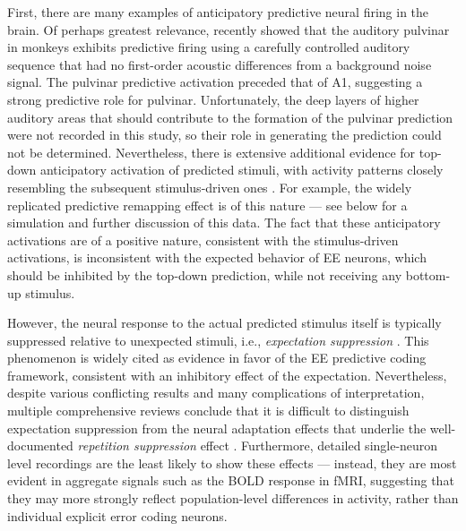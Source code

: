 \documentclass[11pt,twoside]{article}
\newif\myifpdf
\begin{document}
First, there are many examples of anticipatory predictive neural firing in the brain.  Of perhaps greatest relevance, \citet{BarczakOConnellMcGinnisEtAl18} recently showed that the auditory pulvinar in monkeys exhibits predictive firing using a carefully controlled auditory sequence that had no first-order acoustic differences from a background noise signal.  The pulvinar predictive activation preceded that of A1, suggesting a strong predictive role for pulvinar.  Unfortunately, the deep layers of higher auditory areas that should contribute to the formation of the pulvinar prediction were not recorded in this study, so their role in generating the prediction could not be determined.  Nevertheless, there is extensive additional evidence for top-down anticipatory activation of predicted stimuli, with activity patterns closely resembling the subsequent stimulus-driven ones \citep{WalshMcGovernClarkEtAl20}.  For example, the widely replicated predictive remapping effect is of this nature \citep{DuhamelColbyGoldberg92,Wurtz08,CavanaghHuntAfrazEtAl10} --- see below for a simulation and further discussion of this data.  The fact that these anticipatory activations are of a positive nature, consistent with the stimulus-driven activations, is inconsistent with the expected behavior of EE neurons, which should be inhibited by the top-down prediction, while not receiving any bottom-up stimulus.

However, the neural response to the actual predicted stimulus itself is typically suppressed relative to unexpected stimuli, i.e., \emph{expectation suppression} \citep{SummerfieldTrittschuhMontiEtAl08,TodorovicEdeMarisEtAl11,MeyerOlson11,BastosUsreyAdamsEtAl12}.  This phenomenon is widely cited as evidence in favor of the EE predictive coding framework, consistent with an inhibitory effect of the expectation.  Nevertheless, despite various conflicting results and many complications of interpretation, multiple comprehensive reviews conclude that it is difficult to distinguish expectation suppression from the neural adaptation effects that underlie the well-documented \emph{repetition suppression} effect \citep{WalshMcGovernClarkEtAl20,VinkenVogels17,KokLange15,KokJeheedeLange12,SummerfieldEgner09,LeeMumford03}.  Furthermore, detailed single-neuron level recordings are the least likely to show these effects --- instead, they are most evident in aggregate signals such as the BOLD response in fMRI, suggesting that they may more strongly reflect population-level differences in activity, rather than individual explicit error coding neurons.
\end{document}
